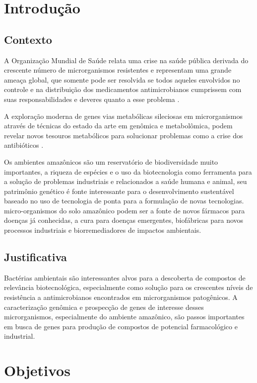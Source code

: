 \chapter{Introdução}
\label{cap:introducao}

\section{Contexto}

A Organização Mundial de Saúde relata uma crise na saúde pública derivada do crescente número
de microrganismos resistentes e representam uma grande ameaça global, que somente
pode ser resolvida se todos aqueles envolvidos no controle e na distribuição
dos medicamentos antimicrobianos cumprissem com suas responsabilidades e deveres 
quanto a esse problema \cite{talebi2019world}.

A exploração moderna de genes vias metabólicas sileciosas em microrganismos
através de técnicas do estado da arte em genômica e metabolômica, podem
revelar novos tesouros metabólicos para solucionar problemas como a crise
dos antibióticos \cite{zhang2021glossary}.

Os ambientes amazônicos são um reservatório de biodiversidade muito importantes,
a riqueza de espécies e o uso da biotecnologia como ferramenta para a solução de problemas industriais  e relacionados
a saúde humana e animal, seu patrimônio genético é fonte interessante para o
desenvolvimento sustentável baseado no uso de tecnologia de ponta para a formulação de novas tecnologias.
micro-organismos do solo amazônico podem ser a fonte de novos fármacos para doenças já conhecidas,
a cura para doenças emergentes, biofábricas para novos processos industriais e biorremediadores
de impactos ambientais.

\section{Justificativa}
Bactérias ambientais são interessantes alvos para a descoberta de compostos
de relevância biotecnológica, especialmente como solução para os crescentes níveis
de resistência a antimicrobianos encontrados em microrganismos patogênicos.
A caracterização genômica e prospecção de genes de interesse desses microrganismos,
especialmente do ambiente amazônico, são passos importantes
em busca de genes para produção de compostos de potencial farmacológico e industrial.

\chapter{Objetivos}

